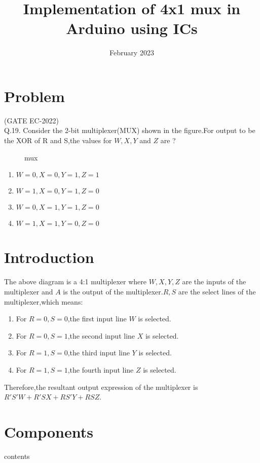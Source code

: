 \documentclass[12pt]{article}
\title{Implementation of 4x1 mux in Arduino using ICs}
\date{February 2023}
\begin{document}
\maketitle
\tableofcontents

	 \section{Problem}
	 (GATE EC-2022)\\

Q.19. Consider the 2-bit multiplexer(MUX) shown in the figure.For output to be the XOR of R and S,the values for $ W,X,Y$ and $Z$ are ?\newline
\begin{figure}[H]

\caption{mux}
\label{fig:1}
\end{figure}
\begin{enumerate}
\item $W = 0, X = 0, Y = 1, Z = 1$
\item $W = 1, X = 0, Y = 1, Z = 0$
\item $W = 0, X = 1, Y = 1, Z = 0$
\item $W = 1, X = 1, Y = 0, Z = 0$
\end{enumerate}
\section{Introduction}
	The above diagram is a 4:1 multiplexer where $W, X, Y, Z$ are the inputs of the multiplexer and $A$ is the output of the multiplexer.$R , S$ are the select lines of the multiplexer,which means:\newline
\begin{enumerate}
\item For $R = 0,S = 0$,the first input line $W$ is selected.
\item For $R = 0,S = 1$,the second input line $X$ is selected.
\item For $R = 1,S = 0$,the third input line $Y$ is selected.
\item For $R = 1,S = 1$,the fourth input line $Z$ is selected.
\end{enumerate}
Therefore,the resultant output expression of the multiplexer is $R'S'W + R'SX + RS'Y + RSZ$.
\section{Components}
\begin{table}[H]
	
\caption{contents}
\label{table 1}
\end{table}
	\pagebreak
\end{document}
